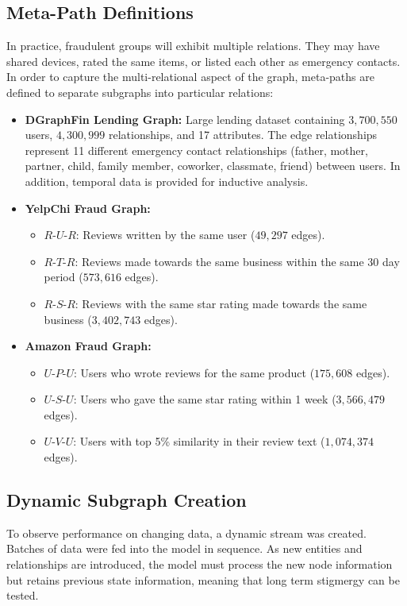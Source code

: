 \subsection{Meta-Path Definitions}
In practice, fraudulent groups will exhibit multiple relations. They may have shared devices, rated the same items, or listed each other as emergency contacts. In order to capture the multi-relational aspect of the graph, meta-paths are defined to separate subgraphs into particular relations:
\begin{itemize}
    \item \textbf{DGraphFin Lending Graph:}
    Large lending dataset containing $3,700,550$ users, $4,300,999$ relationships, and 17 attributes. The edge relationships represent 11 different emergency contact relationships (father, mother, partner, child, family member, coworker, classmate, friend) between users. In addition, temporal data is provided for inductive analysis.
    \item \textbf{YelpChi Fraud Graph:}
    \begin{itemize}
        \item $R\text{-}U\text{-}R$: Reviews written by the same user ($49,297$ edges).
        \item $R\text{-}T\text{-}R$: Reviews made towards the same business within the same 30 day period ($573,616$ edges).
        \item $R\text{-}S\text{-}R$: Reviews with the same star rating made towards the same business ($3,402,743$ edges).
    \end{itemize}
    \item \textbf{Amazon Fraud Graph:}
    \begin{itemize}
        \item $U\text{-}P\text{-}U$: Users who wrote reviews for the same product ($175,608$ edges).
        \item $U\text{-}S\text{-}U$: Users who gave the same star rating within 1 week ($3,566,479$ edges).
        \item $U\text{-}V\text{-}U$: Users with top 5\% similarity in their review text ($1,074,374$ edges).
    \end{itemize}
\end{itemize}

\subsection{Dynamic Subgraph Creation}
To observe performance on changing data, a dynamic stream was created. Batches of data were fed into the model in sequence. As new entities and relationships are introduced, the model must process the new node information but retains previous state information, meaning that long term stigmergy can be tested.

